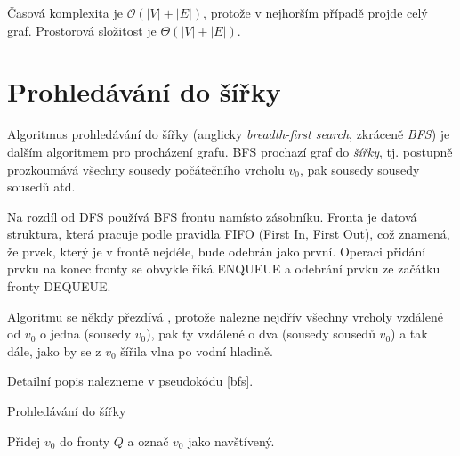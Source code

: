 \documentclass[12pt]{report}			%
\begin{document}
			
			
			Časová komplexita je $\mathcal{O}(|V| + |E|)$, protože v nejhorším případě projde celý graf. Prostorová složitost je $\Theta(|V| + |E|)$.
			
			\section{Prohledávání do šířky}
			Algoritmus prohledávání do šířky (anglicky \emph{breadth-first search}, zkráceně \emph{BFS}) je dalším algoritmem pro procházení grafu. BFS prochazí graf do \emph{šířky}, tj. postupně prozkoumává všechny sousedy počátečního vrcholu $v_0$, pak sousedy sousedy sousedů  atd. %

Na rozdíl od DFS používá BFS frontu namísto zásobníku. Fronta je datová struktura, která pracuje podle pravidla FIFO (First In, First Out), což znamená, že prvek, který je v frontě nejdéle, bude odebrán jako první. Operaci přidání prvku na konec fronty se obvykle říká ENQUEUE a odebrání prvku ze začátku fronty DEQUEUE.

Algoritmu se někdy přezdívá , protože nalezne nejdřív všechny vrcholy vzdálené od $v_0$ o jedna (sousedy $v_0$), pak ty vzdálené o dva (sousedy sousedů $v_0$) a tak dále, jako by se z $v_0$ šířila vlna po vodní hladině.

Detailní popis nalezneme v pseudokódu \ref{bfs}.



\begin{algorithm}

			    \caption{Prohledávání do šířky}
			    \label{bfs}
  				Přidej $v_0$ do fronty $Q$ a označ $v_0$ jako navštívený.
  				
				
				
				\end{algorithm}
\end{document}
